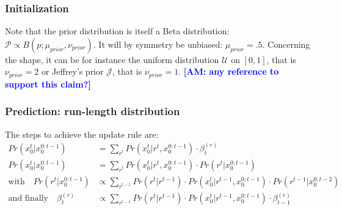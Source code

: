 \documentclass[12pt,english]{article}%
\newcommand{\eqs}[1]{\begin{align*}#1\end{align*}}
\newcommand{\eqa}[1]{\begin{align}#1\end{align}}
\newcommand{\Jj}{\mathcal{J}}
\newcommand{\Pp}{\mathcal{P}}
\newcommand{\Uu}{\mathcal{U}}
\newcommand{\AM}[1]{\textbf{\textcolor{blue}{[AM: #1]}}}
\begin{document}
\subsubsection{Initialization}

%
%

%
%



Note that the prior distribution is itself a Beta distribution:
$\Pp\propto B(p; \mu_{prior}, \nu_{prior})$.
It will by symmetry be unbiased: $\mu_{prior}=.5$.
Concerning the shape, it can be for instance
the uniform distribution $\Uu$ on $ [ 0, 1 ] $, that is $\nu_{prior}=2$ or
Jeffrey's prior $\Jj$, that is $\nu_{prior}=1$.
\AM{any reference to support this claim?}



\subsubsection{Prediction: run-length distribution}

The steps to achieve the update rule are:
\eqs{
Pr(x_0^t | x_0^{0:t-1}) &= \sum_{r^{t}} Pr(x_0^t | r^{t}, x_0^{0:t-1}) \cdot  \beta^{(r)}_t \\
Pr(x_0^t | x_0^{0:t-1}) &= \sum_{r^{t}} Pr(x_0^t | r^{t}, x_0^{0:t-1}) \cdot  Pr(r^{t} | x_0^{0:t-1})\\
\text{with} \quad Pr(r^{t} | x_0^{0:t-1}) &\propto \sum_{r^{t-1}}  Pr(r^t | r^{t-1}) \cdot  Pr(x_0^t | r^{t-1}, x_0^{0:t-1}) \cdot  Pr(r^{t-1} | x_0^{0:t-2}) \\
\text{and finally} \quad \beta^{(r)}_t &\propto \sum_{r^{t-1}}  Pr(r^t | r^{t-1}) \cdot  Pr(x_0^t | r^{t-1}, x_0^{0:t-1}) \cdot  \beta^{(r)}_{t-1}
}
\end{document}
